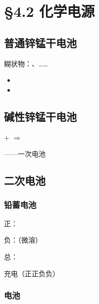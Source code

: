 \section{\S 4.2 化学电源}\label{sect:化学电源}


    \subsection{普通锌锰干电池}\label{subsec:普通锌锰干电池}

        糊状物：、……


        \begin{itemize}
            \item {}
            \item {}
        \end{itemize}

    \subsection{碱性锌锰干电池}\label{subsec:碱性锌锰干电池}

        \(+\)  \(\Rightarrow\) 

        ——一次电池

    \subsection{二次电池}\label{subsec:二次电池}

        \subsubsection{铅蓄电池}\label{subsubsec:铅蓄电池}

            正：

            负：（微溶）

            总：

            充电（正正负负）

        \subsubsection{\texorpdfstring{}{Li+} 电池}\label{subsubsec:锂离子电池}

